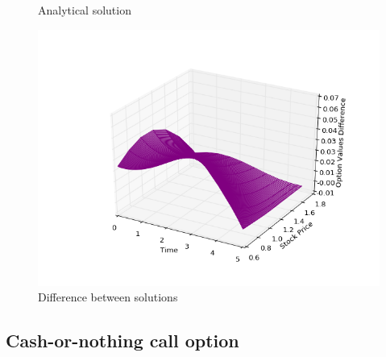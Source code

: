 \documentclass[11pt,a4paper]{extarticle}
\begin{document}
\begin{minipage}{\linewidth}
\begin{minipage}{0.29\linewidth}
\begin{figure}[H]
              \caption{Analytical solution}
          \end{figure}
      \end{minipage}
      \hspace{0.04\linewidth}
      \begin{minipage}{0.29\linewidth}
          \begin{figure}[H]
              \includegraphics[width=\linewidth]{Figures/eu-put-dif}
              \caption{Difference between solutions}
          \end{figure}
      \end{minipage}
\end{minipage}

\subsection{Cash-or-nothing call option}
\end{document}
